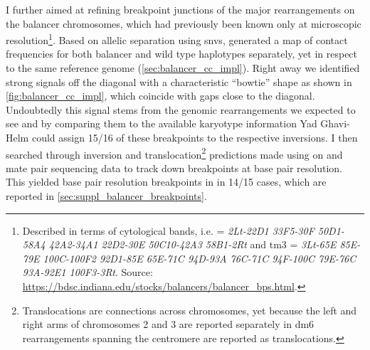 I further aimed at refining breakpoint junctions of the major rearrangements on     
the balancer chromosomes, which had previously been known only at microscopic
resolution\footnote{\label{footnote:balancer_karyotype}
    Described in terms of cytological bands, i.e. \cyo = \textit{2Lt-22D1
    33F5-30F 50D1-58A4 42A2-34A1 22D2-30E 50C10-42A3 58B1-2Rt} and
    \ac{tm3} = \textit{3Lt-65E 85E-79E 100C-100F2 92D1-85E 65E-71C
    94D-93A 76C-71C 94F-100C 79E-76C 93A-92E1 100F3-3Rt}.
    Source: \url{https://bdsc.indiana.edu/stocks/balancers/balancer_bps.html}.}.
Based on allelic separation using \acp{snv}, \alek generated a \hic map of
contact frequencies for both balancer and wild type haplotypes separately, yet
in respect to the same reference genome (\cref{sec:balancer_cc_impl}).
Right away we identified strong signals off the diagonal with a characteristic
``bowtie'' shape as shown in \cref{fig:balancer_cc_impl}, which coincide with
gaps close to the diagonal. Undoubtedly this signal stems from the genomic
rearrangements we expected to see and by comparing them to the available
karyotype information Yad Ghavi-Helm could assign 15/16 of these breakpoints to
the respective inversions. I then searched through inversion and
translocation\footnote{Translocations are connections across chromosomes, yet
    because the left and right arms of chromosomes 2 and 3 are reported
    separately in \ac{dm6} rearrangements spanning the centromere are reported
    as translocations.}
predictions made using \delly on \wgs and mate pair sequencing data to
track down breakpoints at base pair resolution. This yielded base pair
resolution breakpoints in in 14/15 cases, which are reported in
\cref{sec:suppl_balancer_breakpoints}.


